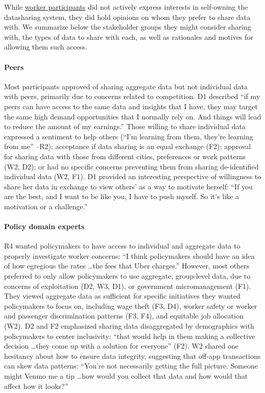 {While \uline{worker participants} did not actively express interests in self-owning the datasharing system, they did hold opinions on whom they prefer to share data with. We summarize below the stakeholder groups they might consider sharing with, the types of data to share with each, as well as rationales and motives for allowing them such access.}

\paragraph{Peers}
Most participants approved of sharing aggregate data but not individual data with peers, primarily due to concerns related to competition. D1 described ``if my peers can have access to the same data and insights that I have, they may target the same high demand opportunities that I normally rely on. And things will lead to reduce the amount of my earnings.'' Those willing to share individual data expressed a sentiment to help others (``I'm learning from them, they're learning from me'' --R2); acceptance if data sharing is an equal exchange (F2); approval for sharing data with those from different cities, preferences or work patterns (W2, D2); or had no specific concerns preventing them from sharing de-identified individual data (W2, F1). D1 provided an interesting perspective of willingness to share her data in exchange to view others' as a way to motivate herself: ``If you are the best, and I want to be like you, I have to push myself. So it's like a motivation or a challenge.''

\paragraph{Policy domain experts}
R4 wanted policymakers to have access to individual and aggregate data to properly investigate worker concerns: ``I think policymakers should have an idea of how egregious the rates \dots the fees that Uber charges.'' However, most others preferred to only allow policymakers to use aggregate, group-level data, due to concerns of exploitation (D2, W3, D1), or government micromanagement (F1). They viewed aggregate data as sufficient for specific initiatives they wanted policymakers to focus on, including wage theft (F3, D4), worker safety or worker and passenger discrimination patterns (F3, F4), and equitable job allocation (W2). D2 and F2 emphasized sharing data disaggregated by demographics with policymakers to center inclusivity: ``that would help in them making a collective decision \dots they come up with a solution for everyone'' (F2). W2 shared one hesitancy about how to ensure data integrity, suggesting that off-app transactions can skew data patterns: ``You're not necessarily getting the full picture. Someone might Venmo me a tip \dots how would you collect that data and how would that affect how it looks?''

